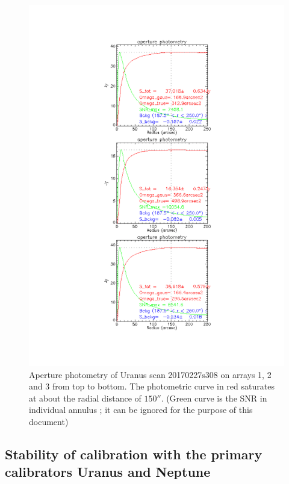 \begin{figure}[p]
\begin{center}
  \includegraphics[clip, angle=0, scale=0.7]{Figures/Uranus_s308.pdf}
  \caption{Aperture photometry of Uranus  scan 20170227s308  on arrays 1, 2 and 3 from top to bottom.
    The photometric curve in red saturates at about the radial
    distance of  $150''$. (Green curve is the SNR in individual
    annulus ; it can be ignored for the purpose of this document)}
\label{fig:PhAp}
\end{center}
\end{figure}


\subsection{Stability of calibration with the primary calibrators Uranus and Neptune }

